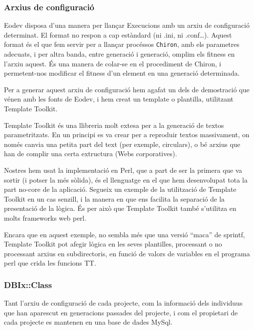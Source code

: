 \documentclass[titlepage,a4paper,12pt]{book}
\begin{document}
\subsubsection{Arxius de configuració} %
\label{ssub:Arxius de configuracio}

Eodev disposa d'una manera per llançar Execucions amb un arxiu de configuració
determinat.  El format no respon a cap estàndard (ni .ini, ni .conf\ldots).
Aquest format és el que fem servir per a llançar procéssos \texttt{Chiron}, amb
els parametres adecuats, i per altra banda, entre generació i generació, omplim
els fitness en l'arxiu aquest.  És una manera de colar-se en el procediment de
Chiron, i permetent-nos modificar el fitness d'un element en una generació
determinada.

Per a generar aquest arxiu de configuració hem agafat un dels de demostració que
vénen amb les fonts de Eodev, i hem creat un template o plantilla, utilitzant
Template Toolkit.

Template Toolkit és una llibreria molt extesa per a la generació de textos
parametritzats.  En un principi es va crear per a reproduir textos massivament,
on només canvia una petita part del text (per exemple, circulars), o bé arxius
que han de complir una certa extructura (Webs corporatives).

Nostres hem usat la implementació en Perl, que a part de ser la primera que va
sortir (i potser la més sòlida), és el llenguatge en el que hem desenvolupat
tota la part no-core de la aplicació.  Segueix un exemple de la utilització de
Template Toolkit en un cas senzill, i la manera en que ens facilita la separació
de la presentació de la lògica.  És per això que Template Toolkit també
s'utilitza en molts frameworks web perl.


Encara que en aquest exemple, no sembla més que una versió ``maca'' de sprintf,
Template Toolkit pot afegir lògica en les seves plantilles, processant o no
processant arxius en subdirectoris, en funció de valors de variables en el
programa perl que crida les funcions TT.


\subsubsection{DBIx::Class} %
\label{ssub:DBIx Class}

Tant l'arxiu de configuració de cada projecte, com la informació dels individuus
que han aparescut en generacions passades del projecte, i com el propietari de
cada projecte es mantenen en una base de dades MySql.
\end{document}
